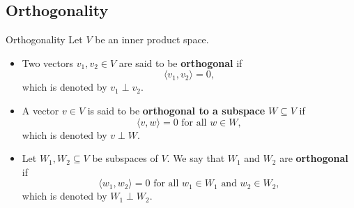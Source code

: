 \subsection{Orthogonality}

\begin{definition}{Orthogonality}{}
    Let $V$ be an inner product space. 
    \begin{itemize}
        \item Two vectors $v_1, v_2\in V$ are said to be \textbf{orthogonal} if
        \[
            \langle v_1, v_2 \rangle = 0,
        \]
        which is denoted by $v_1\perp v_2$.
        \item A vector $v\in V$ is said to be \textbf{orthogonal to a subspace} $W\subseteq V$ if 
        \[          
         \langle v, w \rangle = 0 \text{ for all } w\in W,
        \]
        which is denoted by $v\perp W$.
        \item Let $W_1, W_2\subseteq V$ be subspaces of $V$. We say that $W_1$ and $W_2$ are \textbf{orthogonal} if
        \[
            \langle w_1, w_2 \rangle = 0 \text{ for all } w_1\in W_1 \text{ and } w_2\in W_2,
        \]
        which is denoted by $W_1\perp W_2$.
    \end{itemize}
    
\end{definition}

